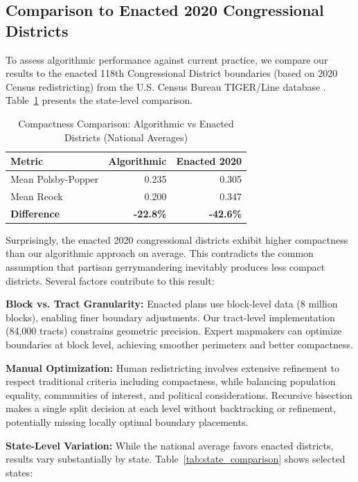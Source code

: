 \subsection{Comparison to Enacted 2020 Congressional Districts}

To assess algorithmic performance against current practice, we compare our results to the enacted 118th Congressional District boundaries (based on 2020 Census redistricting) from the U.S. Census Bureau TIGER/Line database \cite{census2023tigerline}. Table~\ref{tab:baseline_comparison} presents the state-level comparison.

\begin{table}[h]
\centering
\caption{Compactness Comparison: Algorithmic vs Enacted Districts (National Averages)}
\label{tab:baseline_comparison}
\begin{tabular}{lrr}
\toprule
\textbf{Metric} & \textbf{Algorithmic} & \textbf{Enacted 2020} \\
\midrule
Mean Polsby-Popper & 0.235 & 0.305 \\
Mean Reock & 0.200 & 0.347 \\
\midrule
\textbf{Difference} & \textbf{-22.8\%} & \textbf{-42.6\%} \\
\bottomrule
\end{tabular}
\end{table}

Surprisingly, the enacted 2020 congressional districts exhibit higher compactness than our algorithmic approach on average. This contradicts the common assumption that partisan gerrymandering inevitably produces less compact districts. Several factors contribute to this result:

\textbf{Block vs. Tract Granularity:} Enacted plans use block-level data (8 million blocks), enabling finer boundary adjustments. Our tract-level implementation (84,000 tracts) constrains geometric precision. Expert mapmakers can optimize boundaries at block level, achieving smoother perimeters and better compactness.

\textbf{Manual Optimization:} Human redistricting involves extensive refinement to respect traditional criteria including compactness, while balancing population equality, communities of interest, and political considerations. Recursive bisection makes a single split decision at each level without backtracking or refinement, potentially missing locally optimal boundary placements.

\textbf{State-Level Variation:} While the national average favors enacted districts, results vary substantially by state. Table~\ref{tab:state_comparison} shows selected states:

